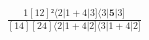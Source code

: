 \documentclass[varwidth, border=5pt]{standalone}
\begin{document}
\begin{my}
$\begin{gathered}
\scriptscriptstyle\frac{1[12]²⟨2|1+4|3]⟨3|𝟓|3]}{[14][24]⟨2|1+4|2]⟨3|1+4|2]}
\end{gathered}$
\end{my}
\end{document}
